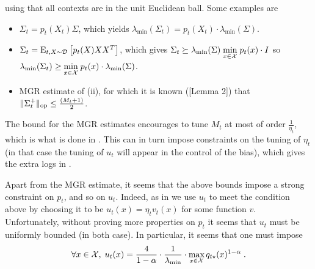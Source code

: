 using that all contexts are in the unit Euclidean ball. Some examples are
\begin{itemize}
	\item[(i)]  $\Sigma_t=p_t(X_t) \Sigma$, which yields $\lambda_{\min}(\Sigma_t) = p_t(X_t)\cdot \lambda_{\min}(\Sigma)$.
	\item[(ii)] $\Sigma_t=\mathrm{E}_{t, X\sim \mathcal{D}}\left[p_t(X) XX^T\right]$, which gives $\Sigma_t\succeq \lambda_{\min}(\Sigma)\; \underset{x\in \mathcal{X}}{ \min } \;p_t(x)\cdot  I$ so $\lambda_{\min}(\Sigma_t) \geq \underset{x\in \mathcal{X}}{ \min }\; p_t(x)  \cdot \lambda_{\min}(\Sigma)$.
	\item[(iii)] MGR estimate of (ii), for which it is known (\cite{BOBWlinear}[Lemma 2]) that $\lVert\Sigma_t^+\rVert_{\text{op}} \leq \frac{(M_t+1)}{2}$.
\end{itemize}

The bound for the MGR estimates encourages to tune $M_t$ at most of order $\frac{1}{\eta_t}$, which is what is done in \cite{BOBWlinear}. This can in turn impose constraints on the tuning of $\eta_t$ (in that case the tuning of $u_t$ will appear in the control of the bias), which gives the extra logs in \cite{BOBWlinear}.  

Apart from the MGR estimate, it seems that the above bounds impose a strong constraint on $p_t$, and so on $u_t$. Indeed, as in \cite{BOBWhardproblems} we use $u_t$ to meet the condition above by choosing it to be $u_t(x)=\eta_t v_t(x)$ for some function $v$. Unfortunately, without proving more properties on $p_t$ it seems that $u_t$ must be uniformly bounded (in both case). In particular, it seems that one must impose 
\begin{equation}\label{eq::cond_ut}\forall x \in \mathcal{X}, \; u_t(x) = \frac{4}{1-\alpha}\cdot \frac{1}{\lambda_{\min}} \cdot \max_{x\in \mathcal{X}} q_{t\star}(x)^{1-\alpha} \;. 
\end{equation}





